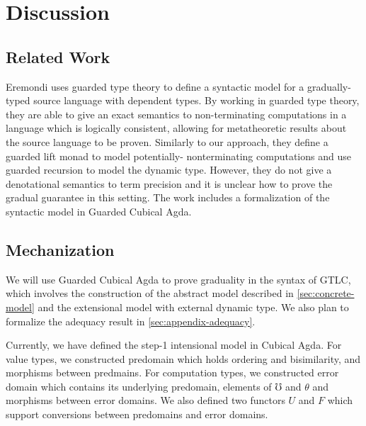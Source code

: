 \section{Discussion}

\subsection{Related Work}
Eremondi \cite{Eremondi_2023} uses guarded type theory to
define a syntactic model for a gradually-typed source
language with dependent types. By working in guarded type theory, they are
able to give an exact semantics to non-terminating computations in a language
which is logically consistent, allowing for metatheoretic results about the
source language to be proven.
%
Similarly to our approach, they define a guarded lift monad to model potentially-
nonterminating computations and use guarded recursion to model the dynamic type.
However, they do not give a denotational semantics to term precision and it is unclear
how to prove the gradual guarantee in this setting.
The work includes a formalization of the syntactic model in Guarded Cubical Agda.



\subsection{Mechanization}
We will use Guarded Cubical Agda to prove graduality in the syntax of 
GTLC, which involves the construction of the abstract model described in 
\ref{sec:concrete-model} and the extensional model with external dynamic 
type. We also plan to formalize the adequacy result in \ref{sec:appendix-adequacy}.

Currently, we have defined the step-1 intensional model in Cubical 
Agda. For value types, we constructed predomain which holds ordering and 
bisimilarity, and morphisms between predmains. For computation types, we 
constructed error domain which contains its underlying predomain, 
elements of $\mho$ and $\theta$ and morphisms between error domains. We 
also defined two functors $U$ and $F$ which support conversions between 
predomains and error domains.

